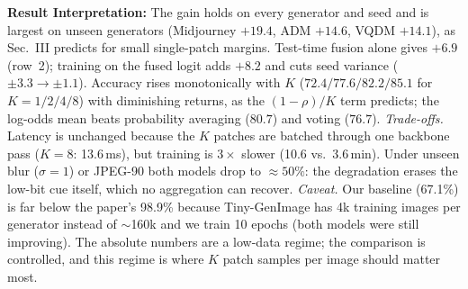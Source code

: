 \documentclass[8pt,a4paper]{article}
\begin{document}
\textbf{Result Interpretation:}
The gain holds on every generator and seed and is largest on unseen generators (Midjourney $+19.4$, ADM $+14.6$, VQDM $+14.1$), as Sec.~III predicts for small single-patch margins. Test-time fusion alone gives $+6.9$ (row~2); training on the fused logit adds $+8.2$ and cuts seed variance ($\pm3.3\to\pm1.1$). Accuracy rises monotonically with $K$ ($72.4/77.6/82.2/85.1$ for $K{=}1/2/4/8$) with diminishing returns, as the $(1-\rho)/K$ term predicts; the log-odds mean beats probability averaging ($80.7$) and voting ($76.7$).
\emph{Trade-offs.} Latency is unchanged because the $K$ patches are batched through one backbone pass ($K{=}8$: 13.6\,ms), but training is $3\times$ slower (10.6 vs.\ 3.6\,min). Under unseen blur ($\sigma{=}1$) or JPEG-90 both models drop to $\approx50\%$: the degradation erases the low-bit cue itself, which no aggregation can recover.
\emph{Caveat.} Our baseline (67.1\%) is far below the paper's 98.9\% because Tiny-GenImage has 4k training images per generator instead of $\sim$160k and we train 10 epochs (both models were still improving). The absolute numbers are a low-data regime; the comparison is controlled, and this regime is where $K$ patch samples per image should matter most.
\end{document}
